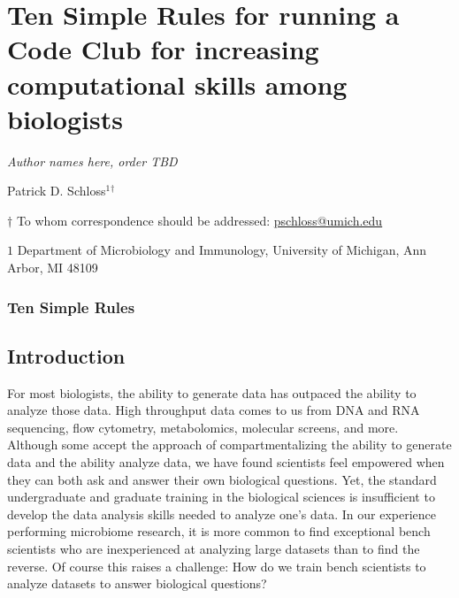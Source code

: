 \documentclass[
  11pt,
]{article}
\author{}
\date{\vspace{-2.5em}}
\begin{document}
\vspace{10mm}

\hypertarget{ten-simple-rules-for-running-a-code-club-for-increasing-computational-skills-among-biologists}{%
\section{Ten Simple Rules for running a Code Club for increasing
computational skills among
biologists}\label{ten-simple-rules-for-running-a-code-club-for-increasing-computational-skills-among-biologists}}

\vspace{35mm}

\emph{Author names here, order TBD}

Patrick D. Schloss\({^1}\)\({^\dagger}\)

\vspace{40mm}

\(\dagger\) To whom correspondence should be addressed:
\href{mailto:pschloss@umich.edu}{pschloss@umich.edu}

\(1\) Department of Microbiology and Immunology, University of Michigan,
Ann Arbor, MI 48109

\vspace{35mm}

\hypertarget{ten-simple-rules}{%
\subsubsection{Ten Simple Rules}\label{ten-simple-rules}}

\newpage
\linenumbers

\hypertarget{introduction}{%
\subsection{Introduction}\label{introduction}}

For most biologists, the ability to generate data has outpaced the
ability to analyze those data. High throughput data comes to us from DNA
and RNA sequencing, flow cytometry, metabolomics, molecular screens, and
more. Although some accept the approach of compartmentalizing the
ability to generate data and the ability analyze data, we have found
scientists feel empowered when they can both ask and answer their own
biological questions. Yet, the standard undergraduate and graduate
training in the biological sciences is insufficient to develop the data
analysis skills needed to analyze one's data. In our experience
performing microbiome research, it is more common to find exceptional
bench scientists who are inexperienced at analyzing large datasets than
to find the reverse. Of course this raises a challenge: How do we train
bench scientists to analyze datasets to answer biological questions?
\end{document}
